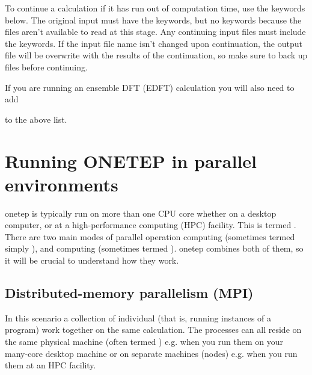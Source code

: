 \documentclass[letterpaper,10pt,english]{sphinxmanual}
\begin{document}
\begin{DUlineblock}{0em}
\item[] To continue a calculation if it has run out of computation time, use
the keywords below. The original input must have the 
keywords, but no  keywords because the files aren’t available
to read at this stage. Any continuing input files must include the
 keywords. If the input file name isn’t changed upon
continuation, the output file will be overwrite with the results of
the continuation, so make sure to back up files before continuing.
\item[] 
\item[] 
\item[] 
\item[] 
\item[] If you are running an ensemble DFT (EDFT) calculation you will also
need to add
\item[] 
\item[] 
\item[] to the above list.
\end{DUlineblock}


\section{Running ONETEP in parallel environments}
\label{\detokenize{starting_with_onetep:running-onetep-in-parallel-environments}}
onetep is typically run on more than one CPU core \textendash{} whether on a desktop
computer, or at a high-performance computing (HPC) facility. This is
termed . There are two main modes of parallel
operation \textendash{}  computing (sometimes termed simply
), and  computing (sometimes termed
). onetep combines both of them, so it will be crucial to
understand how they work.


\subsection{Distributed-memory parallelism (MPI)}
\label{\detokenize{starting_with_onetep:distributed-memory-parallelism-mpi}}
In this scenario a collection of individual  (that is,
running instances of a program) work together on the same calculation.
The processes can all reside on the same physical machine (often termed
) \textendash{} e.g. when you run them on your many-core desktop machine \textendash{} or
on separate machines (nodes) \textendash{} e.g. when you run them at an HPC
facility.
\end{document}
